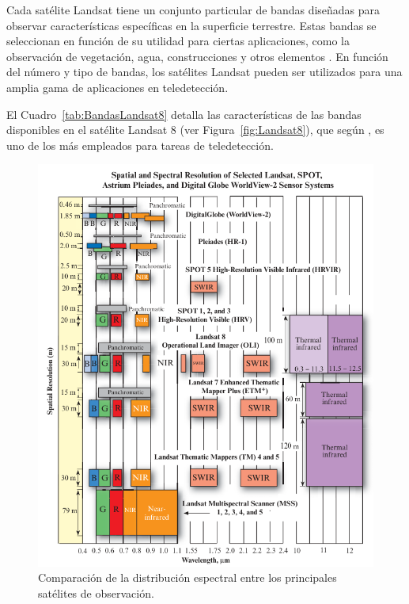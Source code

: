 Cada satélite Landsat tiene un conjunto particular de bandas diseñadas para observar características específicas en la superficie terrestre. Estas bandas se seleccionan en función de su utilidad para ciertas aplicaciones, como la observación de vegetación, agua, construcciones y otros elementos \cite{loveland2016landsat}. En función del número y tipo de bandas, los satélites Landsat pueden ser utilizados para una amplia gama de aplicaciones en teledetección.

El Cuadro~\ref{tab:BandasLandsat8} detalla las características de las bandas disponibles en el satélite Landsat 8 (ver Figura~\ref{fig:Landsat8}), que según \cite{hoeser2020object2}, es uno de los más empleados para tareas de teledetección.

\begin{figure}[H]
    \begin{center}
        \includegraphics[width=1\textwidth]{Images/BANDAS.png}
    \end{center}
    \caption{Comparación de la distribución espectral entre los principales satélites de observación.}
    \label{fig:BANDAS}
\end{figure}

